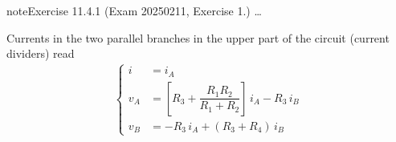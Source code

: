 \documentclass[letterpaper,10pt,english]{jupyterBook}
\begin{document}
\begin{sphinxadmonition}{note}{Exercise 11.4.1 (Exam 2025\sphinxhyphen{}02\sphinxhyphen{}11, Exercise 1.)}
\sphinxAtStartPar
{} …



\sphinxAtStartPar
Currents in the two parallel branches in the upper part of the circuit (current dividers) read
\begin{equation*}
\begin{split}\begin{cases}
  i   & = i_A \\
  v_A & = \left[ R_3 + \dfrac{R_1 R_2}{R_1 + R_2} \right] \, i_A - R_3 \, i_B \\
  v_B & = -R_3 \, i_A + (R_3 + R_4) \, i_B
\end{cases}\end{split}
\end{equation*}
\begin{figure}[htbp]
\centering

\noindent{}
\end{figure}


\end{sphinxadmonition}
\end{document}
